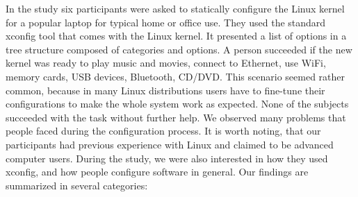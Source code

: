 \documentclass{chi2009}
\begin{document}
In the study six participants were asked to statically configure the Linux kernel for a popular laptop for typical home or office use. They used the standard \textsf{xconfig} tool that comes with the Linux kernel. It presented a list of options in a tree structure composed of categories and options. A person succeeded if the new kernel was ready to play music and movies, connect to Ethernet, use WiFi, memory cards, USB devices, Bluetooth, CD/DVD. This scenario seemed rather common, because in many Linux distributions users have to fine-tune their configurations to make the whole system work as expected. None of the subjects succeeded with the task without further help. We observed many problems that people faced during the configuration process. It is worth noting, that our participants had previous experience with Linux and claimed to be advanced computer users. During the study, we were also interested in how they used \textsf{xconfig}, and how people configure software in general. Our findings are summarized in several categories:
\end{document}
